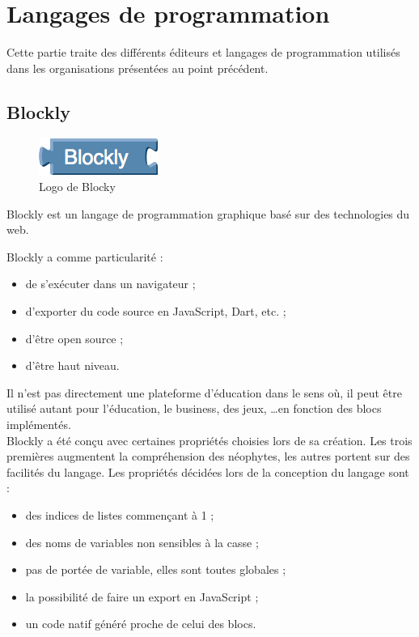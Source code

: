﻿\section{Langages de programmation}
\label{langages}
Cette partie traite des différents éditeurs et langages de programmation utilisés dans les organisations présentées au point précédent.

\subsection{Blockly}
\label{blockly}

\begin{figure}[!ht]
  \begin{center}
    \includegraphics[scale=0.5]{content/5-related_work/images/blocky}
    \caption{Logo de Blocky}
    \label{fig:blocky}
  \end{center}
\end{figure}
Blockly \cite{blockly} est un langage de programmation graphique basé sur des technologies du web.

Blockly a comme particularité :
\begin{itemize}
\item de s'exécuter dans un navigateur ;
\item d'exporter du code source en JavaScript, Dart, etc. ;
\item d'être open source ;
\item d'être haut niveau.
\end{itemize}

Il n'est pas directement une plateforme d'éducation dans le sens où, il peut être utilisé autant pour l'éducation, le business, des jeux, \ldots en fonction des \glspl{bloc} implémentés.\\

Blockly a été conçu avec certaines propriétés choisies lors de sa création. Les trois premières augmentent la compréhension des néophytes, les autres portent sur des facilités du langage. Les propriétés décidées lors de la conception du langage sont \cite{blockly-lang} :

\begin{itemize}
  \item des indices de listes commençant à 1 ;
  \item des noms de variables non sensibles à la casse ;
  \item pas de portée de variable, elles sont toutes globales ;
  \item la possibilité de faire un export en JavaScript ;
  \item un code natif généré proche de celui des \glspl{bloc}.
\end{itemize}

